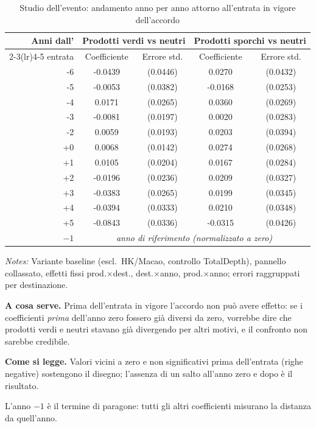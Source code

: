 \begin{table}[htbp]
\centering
\footnotesize
\caption{Studio dell'evento: andamento anno per anno attorno all'entrata in vigore dell'accordo}
\label{tab:eventstudy}
\begin{threeparttable}
\begin{tabular}{rcccc}
\toprule
Anni dall' & \multicolumn{2}{c}{Prodotti verdi vs neutri} & \multicolumn{2}{c}{Prodotti sporchi vs neutri} \\
\cmidrule(lr){2-3}\cmidrule(lr){4-5}
entrata & Coefficiente & Errore std. & Coefficiente & Errore std. \\
\midrule
-6 & -0.0439 & (0.0446) & 0.0270 & (0.0432) \\
-5 & -0.0053 & (0.0382) & -0.0168 & (0.0253) \\
-4 & 0.0171 & (0.0265) & 0.0360 & (0.0269) \\
-3 & -0.0081 & (0.0197) & 0.0020 & (0.0283) \\
-2 & 0.0059 & (0.0193) & 0.0203 & (0.0394) \\
+0 & 0.0068 & (0.0142) & 0.0274 & (0.0268) \\
+1 & 0.0105 & (0.0204) & 0.0167 & (0.0284) \\
+2 & -0.0196 & (0.0236) & 0.0209 & (0.0327) \\
+3 & -0.0383 & (0.0265) & 0.0199 & (0.0345) \\
+4 & -0.0394 & (0.0333) & 0.0210 & (0.0348) \\
+5 & -0.0843 & (0.0336) & -0.0315 & (0.0426) \\
\midrule
$-1$ & \multicolumn{4}{c}{\textit{anno di riferimento (normalizzato a zero)}} \\
\bottomrule
\end{tabular}
\begin{tablenotes}[flushleft]\footnotesize
\item \emph{Notes:} Variante baseline (escl.\ HK/Macao, controllo TotalDepth), pannello collassato, effetti fissi prod.$\times$dest., dest.$\times$anno, prod.$\times$anno; errori raggruppati per destinazione.
\item \textbf{A cosa serve.} Prima dell'entrata in vigore l'accordo non pu\`o avere effetto: se i coefficienti \emph{prima} dell'anno zero fossero gi\`a diversi da zero, vorrebbe dire che prodotti verdi e neutri stavano gi\`a divergendo per altri motivi, e il confronto non sarebbe credibile.
\item \textbf{Come si legge.} Valori vicini a zero e non significativi prima dell'entrata (righe negative) sostengono il disegno; l'assenza di un salto all'anno zero e dopo \`e il risultato.
\item L'anno $-1$ \`e il termine di paragone: tutti gli altri coefficienti misurano la distanza da quell'anno.
\end{tablenotes}
\end{threeparttable}
\end{table}
